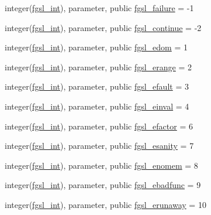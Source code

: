 \begin{DoxyCompactItemize}
\item 
integer(\hyperlink{namespacefgsl_a222deda1d7a0c0e845ce4a683318efeb}{fgsl\+\_\+int}), parameter, public \hyperlink{namespacefgsl_a4cb2b20fedfc04419dd412d3bdc635e0}{fgsl\+\_\+failure} = -\/1
\item 
integer(\hyperlink{namespacefgsl_a222deda1d7a0c0e845ce4a683318efeb}{fgsl\+\_\+int}), parameter, public \hyperlink{namespacefgsl_adaee86adbad23b6853659f6564d6c46b}{fgsl\+\_\+continue} = -\/2
\item 
integer(\hyperlink{namespacefgsl_a222deda1d7a0c0e845ce4a683318efeb}{fgsl\+\_\+int}), parameter, public \hyperlink{namespacefgsl_a4a331f3c353a431cb6975bbe8e0cbf63}{fgsl\+\_\+edom} = 1
\item 
integer(\hyperlink{namespacefgsl_a222deda1d7a0c0e845ce4a683318efeb}{fgsl\+\_\+int}), parameter, public \hyperlink{namespacefgsl_a25790738744df3ed3e0b2d50d9b30976}{fgsl\+\_\+erange} = 2
\item 
integer(\hyperlink{namespacefgsl_a222deda1d7a0c0e845ce4a683318efeb}{fgsl\+\_\+int}), parameter, public \hyperlink{namespacefgsl_a3866fec8a527d4830fa9b88464c52417}{fgsl\+\_\+efault} = 3
\item 
integer(\hyperlink{namespacefgsl_a222deda1d7a0c0e845ce4a683318efeb}{fgsl\+\_\+int}), parameter, public \hyperlink{namespacefgsl_a720540845b1b10b1af117475a2b5f2c7}{fgsl\+\_\+einval} = 4
\item 
integer(\hyperlink{namespacefgsl_a222deda1d7a0c0e845ce4a683318efeb}{fgsl\+\_\+int}), parameter, public \hyperlink{namespacefgsl_a027973d6b14562a967273973aed85e4f}{fgsl\+\_\+efactor} = 6
\item 
integer(\hyperlink{namespacefgsl_a222deda1d7a0c0e845ce4a683318efeb}{fgsl\+\_\+int}), parameter, public \hyperlink{namespacefgsl_a9dc60d8f0ce30b7b328d703d09a0e987}{fgsl\+\_\+esanity} = 7
\item 
integer(\hyperlink{namespacefgsl_a222deda1d7a0c0e845ce4a683318efeb}{fgsl\+\_\+int}), parameter, public \hyperlink{namespacefgsl_a70b026317b5a6f797b14978468ca01d9}{fgsl\+\_\+enomem} = 8
\item 
integer(\hyperlink{namespacefgsl_a222deda1d7a0c0e845ce4a683318efeb}{fgsl\+\_\+int}), parameter, public \hyperlink{namespacefgsl_aee7266f310ad4022066e6fe82eecc0f9}{fgsl\+\_\+ebadfunc} = 9
\item 
integer(\hyperlink{namespacefgsl_a222deda1d7a0c0e845ce4a683318efeb}{fgsl\+\_\+int}), parameter, public \hyperlink{namespacefgsl_a89dc8311615f753f8b0b83a60e5f16c0}{fgsl\+\_\+erunaway} = 10
\item 

\end{DoxyCompactItemize}
